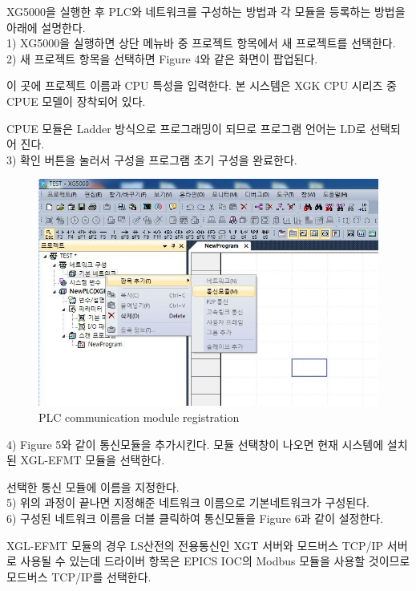 \documentclass[11pt
  , a4paper
  , article
  , oneside
]{memoir}
\begin{document}
 \newpage 
 
 XG5000을 실행한 후 PLC와 네트워크를 구성하는 방법과 각 모듈을 등록하는 방법을 아래에 설명한다. \\
 
 1) XG5000을 실행하면 상단 메뉴바 중 프로젝트 항목에서 새 프로젝트를 선택한다.\\
 
 2) 새 프로젝트 항목을 선택하면 Figure 4와 같은 화면이 팝업된다.\
 
    이 곳에 프로젝트 이름과 CPU 특성을 입력한다. 본 시스템은 XGK CPU 시리즈 중 CPUE 모델이 장착되어 있다.\
    
    CPUE 모듈은 Ladder 방식으로 프로그래밍이 되므로 프로그램 언어는 LD로 선택되어 진다.\\

 3) 확인 버튼을 눌러서 구성을 프로그램 초기 구성을 완료한다.\\
 
  \begin{figure}[h]
  	\centering
  	\includegraphics[width=0.85 \textwidth]{./picture/add_com_module.JPG}
  	\caption{
  		PLC communication module registration
  	}
  	\label{fig:}
  \end{figure}
 
  4) Figure 5와 같이 통신모듈을 추가시킨다. 모듈 선택창이 나오면 현재 시스템에 설치된 XGL-EFMT 모듈을 선택한다.\
  
    선택한 통신 모듈에 이름을 지정한다.\\
  
  5) 위의 과정이 끝나면 지정해준 네트워크 이름으로 기본네트워크가 구성된다.\\
  
  6) 구성된 네트워크 이름을 더블 클릭하여 통신모듈을 Figure 6과 같이 설정한다.\
     
     XGL-EFMT 모듈의 경우 LS산전의 전용통신인 XGT 서버와 모드버스 TCP/IP 서버로 사용될 수 있는데 드라이버 항목은 EPICS IOC의 Modbus 모듈을 사용할 것이므로 모드버스 TCP/IP를 선택한다.\\
     
\end{document}

